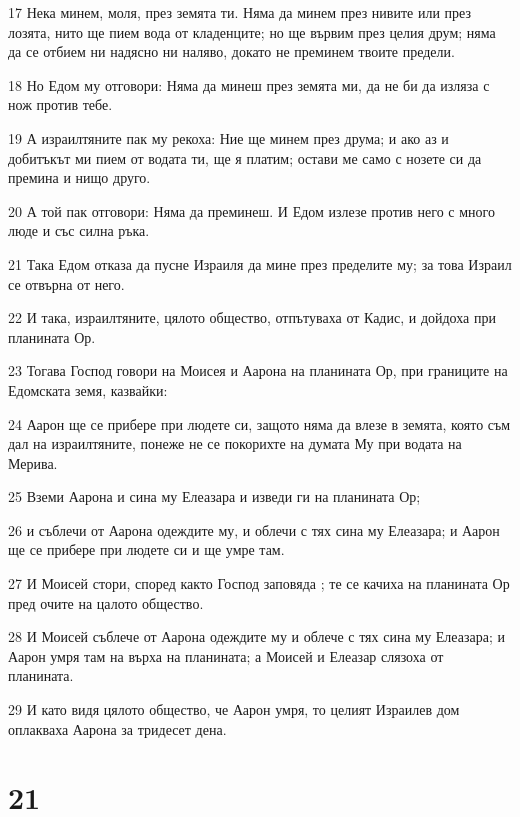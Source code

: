 \par 17 Нека минем, моля, през земята ти. Няма да минем през нивите или през лозята, нито ще пием вода от кладенците; но ще вървим през целия друм; няма да се отбием ни надясно ни наляво, докато не преминем твоите предели.
\par 18 Но Едом му отговори: Няма да минеш през земята ми, да не би да изляза с нож против тебе.
\par 19 А израилтяните пак му рекоха: Ние ще минем през друма; и ако аз и добитъкът ми пием от водата ти, ще я платим; остави ме само с нозете си да премина и нищо друго.
\par 20 А той пак отговори: Няма да преминеш. И Едом излезе против него с много люде и със силна ръка.
\par 21 Така Едом отказа да пусне Израиля да мине през пределите му; за това Израил се отвърна от него.
\par 22 И така, израилтяните, цялото общество, отпътуваха от Кадис, и дойдоха при планината Ор.
\par 23 Тогава Господ говори на Моисея и Аарона на планината Ор, при границите на Едомската земя, казвайки:
\par 24 Аарон ще се прибере при людете си, защото няма да влезе в земята, която съм дал на израилтяните, понеже не се покорихте на думата Му при водата на Мерива.
\par 25 Вземи Аарона и сина му Елеазара и изведи ги на планината Ор;
\par 26 и съблечи от Аарона одеждите му, и облечи с тях сина му Елеазара; и Аарон ще се прибере при людете си и ще умре там.
\par 27 И Моисей стори, според както Господ заповяда ; те се качиха на планината Ор пред очите на цалото общество.
\par 28 И Моисей съблече от Аарона одеждите му и облече с тях сина му Елеазара; и Аарон умря там на върха на планината; а Моисей и Елеазар слязоха от планината.
\par 29 И като видя цялото общество, че Аарон умря, то целият Израилев дом оплакваха Аарона за тридесет дена.

\chapter{21}

